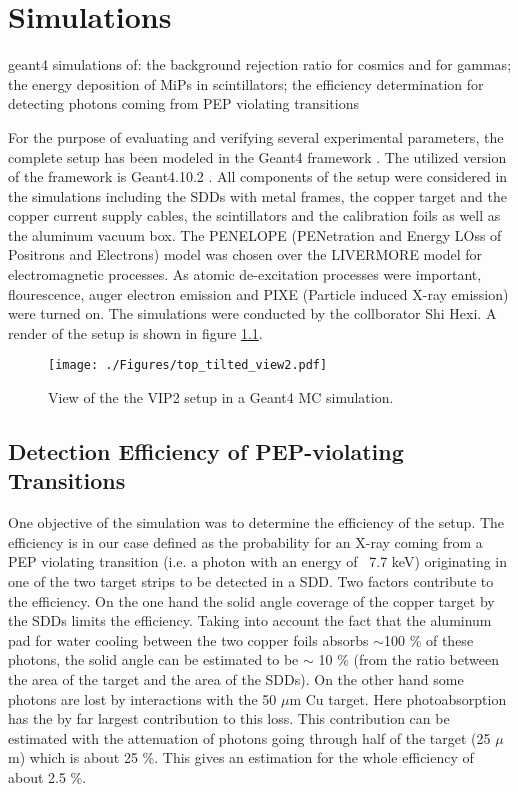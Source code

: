 \chapter{Simulations}
\label{chap:Simulation}

geant4 simulations of: the background rejection ratio for cosmics and for gammas; the energy deposition of MiPs in scintillators; the efficiency determination for detecting photons coming from PEP violating transitions

For the purpose of evaluating and verifying several experimental parameters, the complete setup has been modeled in the Geant4 framework \cite{Agostinelli2003}. The utilized version of the framework is     Geant4.10.2 . All components of the setup were considered in the simulations including the SDDs with metal frames, the copper target and the copper current supply cables, the scintillators and the calibration foils as well as the aluminum vacuum box. The PENELOPE (PENetration and Energy LOss of Positrons and Electrons) model was chosen over the LIVERMORE model for electromagnetic processes. As atomic de-excitation processes were important, flourescence, auger electron emission and PIXE (Particle induced X-ray emission) were turned on. The simulations were conducted by the collborator Shi Hexi. A render of the setup is shown in figure \ref{fig:mc_setup}.
\begin{figure}[h]
 \centering
 \texttt{[image: ./Figures/top\_tilted\_view2.pdf]}
 \caption{View of the the VIP2 setup in a Geant4 MC simulation.}
 \label{fig:mc_setup}
\end{figure}

\section{Detection Efficiency of PEP-violating Transitions}

One objective of the simulation was to determine the efficiency of the setup. The efficiency is in our case defined as the probability for an X-ray coming from a PEP violating transition (i.e. a photon with an energy of ~7.7 keV) originating in one of the two target strips to be detected in a SDD. Two factors contribute to the efficiency. On the one hand the solid angle coverage of the copper target by the SDDs limits the efficiency. Taking into account the fact that the aluminum pad for water cooling between the two copper foils absorbs $\sim$100 \% of these photons, the solid angle can be estimated to be $\sim$ 10 \% (from the ratio between the area of the target and the area of the SDDs). On the other hand some photons are lost by interactions with the 50 $\mu$m Cu target. Here photoabsorption has the by far largest contribution to this loss. This contribution can be estimated with the attenuation of photons going through half of the target (25 $\mu$m) which is about 25 \%. This gives an estimation for the whole efficiency of about 2.5 \%.


